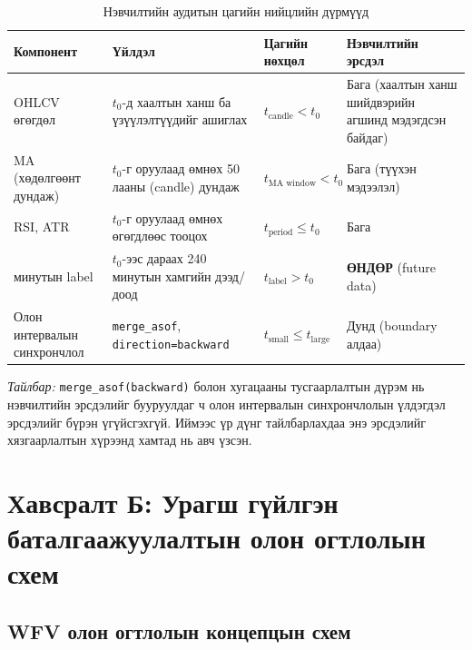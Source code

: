 \begin{table}[H]
\centering
\caption{Нэвчилтийн аудитын цагийн нийцлийн дүрмүүд}
\label{tab:leakage_audit_rules}
\setlength{\tabcolsep}{3pt}
\renewcommand{\arraystretch}{1.15}
\footnotesize
\begin{tabularx}{\textwidth}{|>{\raggedright\arraybackslash}p{2.6cm}|>{\raggedright\arraybackslash}X|>{\centering\arraybackslash}p{2.4cm}|>{\raggedright\arraybackslash}X|}
\hline
\textbf{Компонент} & \textbf{Үйлдэл} & \textbf{Цагийн нөхцөл} & \textbf{Нэвчилтийн эрсдэл} \\ \hline
OHLCV өгөгдөл & $t_0$-д хаалтын ханш ба үзүүлэлтүүдийг ашиглах & $t_{\text{candle}} < t_0$ & Бага (хаалтын ханш шийдвэрийн агшинд мэдэгдсэн байдаг) \\ \hline
MA (хөдөлгөөнт дундаж) & $t_0$-г оруулаад өмнөх 50 лааны (candle) дундаж & $t_{\text{MA window}} < t_0$ & Бага (түүхэн мэдээлэл) \\ \hline
RSI, ATR & $t_0$-г оруулаад өмнөх өгөгдлөөс тооцох & $t_{\text{period}} \leq t_0$ & Бага \\ \hline
240 минутын label & $t_0$-ээс дараах 240 минутын хамгийн дээд/доод & $t_{\text{label}} > t_0$ & \textbf{ӨНДӨР} (future data) \\ \hline
Олон интервалын синхрончлол & \texttt{merge\_asof}, \texttt{direction=backward} & $t_{\text{small}} \leq t_{\text{large}}$ & Дунд (boundary алдаа) \\ \hline
\end{tabularx}
\end{table}

\noindent\textit{Тайлбар:} \texttt{merge\_asof(backward)} болон хугацааны тусгаарлалтын дүрэм нь нэвчилтийн эрсдэлийг бууруулдаг ч олон интервалын синхрончлолын үлдэгдэл эрсдэлийг бүрэн үгүйсгэхгүй. Иймээс үр дүнг тайлбарлахдаа энэ эрсдэлийг хязгаарлалтын хүрээнд хамтад нь авч үзсэн.

\section*{Хавсралт Б: Урагш гүйлгэн баталгаажуулалтын олон огтлолын схем}
\label{app:wfv_multifold}
\renewcommand{\thetable}{Б.\arabic{table}}
\renewcommand{\thefigure}{Б.\arabic{figure}}
\setcounter{table}{0}
\setcounter{figure}{0}

\subsection*{WFV олон огтлолын концепцын схем}

